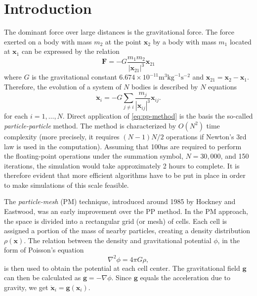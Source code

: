 \section{Introduction}
The dominant force over large distances is the gravitational force.
The force exerted on a body with mass $m_2$ at the point $\mathbf{x}_2$ by a body with mass $m_1$ located at $\mathbf{x}_1$ can be expressed by the relation
\begin{equation*}\label{eq:law-of-uni-grav}
    \mathbf{F} = -G\frac{m_1m_2}{|\mathbf{x}_{21}|^3}\mathbf{x}_{21}
\end{equation*}
where $G$ is the gravitational constant $6.674\times 10^{-11} \mathrm{m}^3  \mathrm{kg}^{-1}\mathrm{s}^{-2}$ and $\mathbf{x}_{21} = \mathbf{x}_2 - \mathbf{x}_1$.
Therefore, the evolution of a system of $N$ bodies is described by $N$ equations
\begin{equation}\label{eq:pp-method}
    \ddot{\mathbf{x}}_i = -G\sum_{j\neq i} \frac{m_j}{|\mathbf{x}_{ij}|^3}\mathbf{x}_{ij}.
\end{equation}
for each $i = 1,\dots, N$.
Direct application of \autoref{eq:pp-method} is the basis the so-called \textit{particle-particle} method.
The method is characterized by $O(N^2)$ time complexity (more precisely, it requires $(N-1)N/2$ operations if Newton's 3rd law is used in the computation).
Assuming that 100ns are required to perform the floating-point operations under the summation symbol, $N=30,000$, and 150 iterations, the simulation would take approximately 2 hours to complete.
It is therefore evident that more efficient algorithms have to be put in place in order to make simulations of this scale feasible.

The \textit{particle-mesh} (PM) technique, introduced around 1985 by Hockney and Eastwood, was an early improvement over the PP method.
In the PM approach, the space is divided into a rectangular grid (or mesh) of cells.
Each cell is assigned a portion of the mass of nearby particles, creating a density distribution $\rho(\mathbf{x})$.
The relation between the density and gravitational potential $\phi$, in the form of Poisson's equation
\begin{equation}\label{eq:poisson}
    \nabla^2\phi = 4\pi G \rho,
\end{equation}
is then used to obtain the potential at each cell center.
The gravitational field $\mathbf{g}$ can then be calculated as $\mathbf{g} = -\nabla \phi$.
Since $\mathbf{g}$ equals the acceleration due to gravity, we get $\ddot{\mathbf{x}}_i = \mathbf{g}(\mathbf{x}_i)$.


